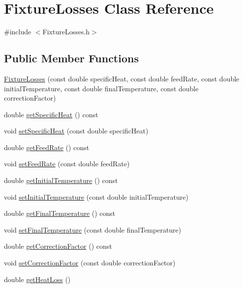 \hypertarget{class_fixture_losses}{}\section{Fixture\+Losses Class Reference}
\label{class_fixture_losses}


{\ttfamily \#include $<$Fixture\+Losses.\+h$>$}

\subsection*{Public Member Functions}
\begin{DoxyCompactItemize}
\item 
\hyperlink{class_fixture_losses_a97002e16f3f1be19983151cacec02f36}{Fixture\+Losses} (const double specific\+Heat, const double feed\+Rate, const double initial\+Temperature, const double final\+Temperature, const double correction\+Factor)
\item 
double \hyperlink{class_fixture_losses_adb3ea84a757bac31c52784cdd15349ea}{get\+Specific\+Heat} () const
\item 
void \hyperlink{class_fixture_losses_a946e4b6da1cca9f27e57f97688499ee1}{set\+Specific\+Heat} (const double specific\+Heat)
\item 
double \hyperlink{class_fixture_losses_a09707af8de4b304c65f4aeb1130ea44e}{get\+Feed\+Rate} () const
\item 
void \hyperlink{class_fixture_losses_a6543643db6b28f3a78397c97d9c5135f}{set\+Feed\+Rate} (const double feed\+Rate)
\item 
double \hyperlink{class_fixture_losses_aaa2e1042b71482b377e93d675909f78e}{get\+Initial\+Temperature} () const
\item 
void \hyperlink{class_fixture_losses_ad3f2a1013dc5da103f2bcfc1357a449b}{set\+Initial\+Temperature} (const double initial\+Temperature)
\item 
double \hyperlink{class_fixture_losses_a5c4259a78f78c675b063290f0fe6ea36}{get\+Final\+Temperature} () const
\item 
void \hyperlink{class_fixture_losses_a5b65e7118cb96c4f4c88c0d6d1a4f6d3}{set\+Final\+Temperature} (const double final\+Temperature)
\item 
double \hyperlink{class_fixture_losses_af643d715a8b1369efa586fa43e75c732}{get\+Correction\+Factor} () const
\item 
void \hyperlink{class_fixture_losses_a3a3dd839d71adb630e7ce76644f18098}{set\+Correction\+Factor} (const double correction\+Factor)
\item 
double \hyperlink{class_fixture_losses_a6829840bdf0607d52adaa9b5ee6ded75}{get\+Heat\+Loss} ()
\end{DoxyCompactItemize}


